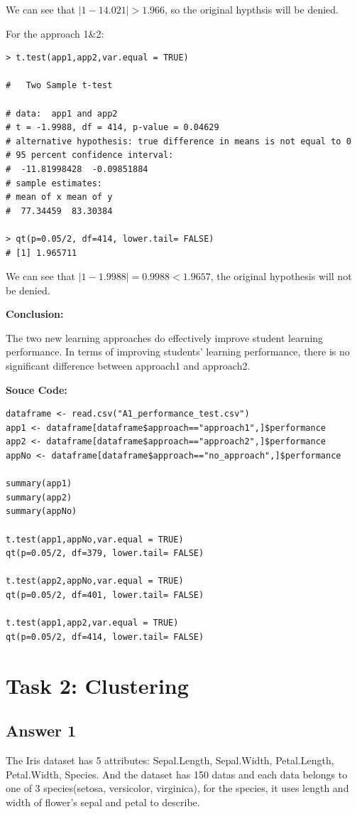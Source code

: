 \documentclass{article}
\begin{document}
We can see that $|1-14.021| > 1.966$, so the original hypthsis will be denied.

For the approach 1\&2:
\begin{lstlisting}
> t.test(app1,app2,var.equal = TRUE)

# 	Two Sample t-test

# data:  app1 and app2
# t = -1.9988, df = 414, p-value = 0.04629
# alternative hypothesis: true difference in means is not equal to 0
# 95 percent confidence interval:
#  -11.81998428  -0.09851884
# sample estimates:
# mean of x mean of y 
#  77.34459  83.30384 

> qt(p=0.05/2, df=414, lower.tail= FALSE)
# [1] 1.965711
\end{lstlisting}

We can see that $|1-1.9988| = 0.9988 < 1.9657$, the original hypothesis will not be denied.

\textbf{Conclusion:}

The two new learning approaches do effectively improve student learning performance.
In terms of improving students’ learning performance, there is no significant difference between approach1 and approach2.

\textbf{Souce Code:}
\begin{lstlisting}
dataframe <- read.csv("A1_performance_test.csv")
app1 <- dataframe[dataframe$approach=="approach1",]$performance
app2 <- dataframe[dataframe$approach=="approach2",]$performance
appNo <- dataframe[dataframe$approach=="no_approach",]$performance

summary(app1)
summary(app2)
summary(appNo)

t.test(app1,appNo,var.equal = TRUE)
qt(p=0.05/2, df=379, lower.tail= FALSE)

t.test(app2,appNo,var.equal = TRUE)
qt(p=0.05/2, df=401, lower.tail= FALSE)

t.test(app1,app2,var.equal = TRUE)
qt(p=0.05/2, df=414, lower.tail= FALSE)

\end{lstlisting}

\section{Task 2: Clustering}
\subsection{Answer 1}
The Iris dataset has 5 attributes: Sepal.Length, Sepal.Width, Petal.Length, Petal.Width, Species.
And the dataset has 150 datas and each data belongs to one of 3 species(setosa, versicolor, virginica),
for the species, it uses length and width of flower's sepal and petal to describe.
\end{document}
